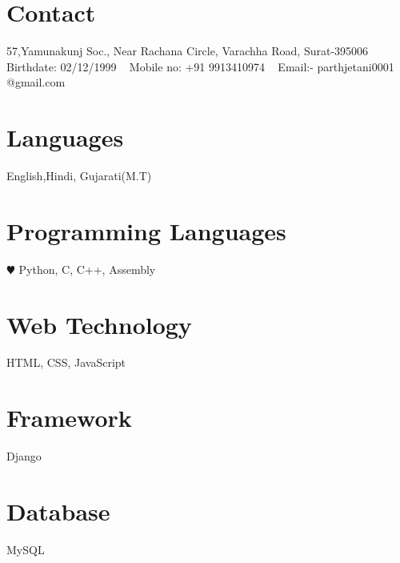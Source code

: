 \documentclass[]{cv-style}          %
\begin{document}



\begin{aside}
%
\section{Contact}
57,Yamunakunj Soc.,
Near Rachana Circle,
Varachha Road,
Surat-395006
~
Birthdate:
02/12/1999
~
Mobile no:
+91 9913410974
~
Email:-
parthjetani0001
@gmail.com
~
%
\section{Languages }
{\vspace{0.1cm}}English,Hindi,
Gujarati(M.T)
%
{\vspace{0.5cm}}\section{Programming
   Languages}
{\vspace{0.1cm}}{\color{red} $\varheartsuit$} Python, C, C++,
Assembly
\section{Web Technology }
{\vspace{0.1cm}}HTML, CSS, JavaScript
\section{Framework }
{\vspace{0.1cm}}Django
\section{Database }
{\vspace{0.1cm}}MySQL
\end{aside}




\vspace{0.3cm}
\end{document}
